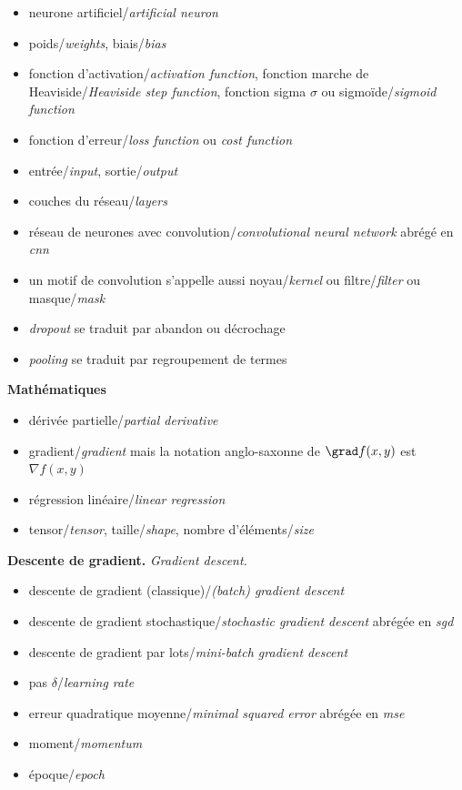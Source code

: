 \documentclass[11pt,class=report,crop=false]{standalone}
\begin{document}
\begin{itemize}
  \item neurone artificiel/\emph{artificial neuron}
  \item poids/\emph{weights}, biais/\emph{bias}
  \item fonction d'activation/\emph{activation function}, fonction marche de Heaviside/\emph{Heaviside step function}, fonction sigma $\sigma$ ou sigmoïde/\emph{sigmoid function}
  \item fonction d'erreur/\emph{loss function} ou \emph{cost function}
  \item entrée/\emph{input}, sortie/\emph{output}
  \item couches du réseau/\emph{layers}
  \item réseau de neurones avec convolution/\emph{convolutional neural network} abrégé en \emph{cnn}
  \item un motif de convolution s'appelle aussi noyau/\emph{kernel} ou filtre/\emph{filter}
 ou masque/\emph{mask}
  \item \emph{dropout} se traduit par abandon ou décrochage
  \item \emph{pooling} se traduit par regroupement de termes
\end{itemize} 
 
\medskip

\textbf{Mathématiques}

\begin{itemize}
  \item dérivée partielle/\emph{partial derivative}
  \item gradient/\emph{gradient} mais la notation anglo-saxonne de $\grad f(x,y)$ est $\nabla f(x,y)$
  \item régression linéaire/\emph{linear regression}
  \item tensor/\emph{tensor}, taille/\emph{shape}, nombre d'éléments/\emph{size}
\end{itemize} 
 
 
\medskip
 
\textbf{Descente de gradient.} \emph{Gradient descent.}

\begin{itemize}
 \item descente de gradient (classique)/\emph{(batch) gradient descent}
 \item descente de gradient stochastique/\emph{stochastic gradient descent} abrégée en \emph{sgd}
 \item descente de gradient par lots/\emph{mini-batch gradient descent}
 \item pas $\delta$/\emph{learning rate}
 \item erreur quadratique moyenne/\emph{minimal squared error} abrégée en \emph{mse}
 \item moment/\emph{momentum}
 \item époque/\emph{epoch}
\end{itemize}  
\end{document}
